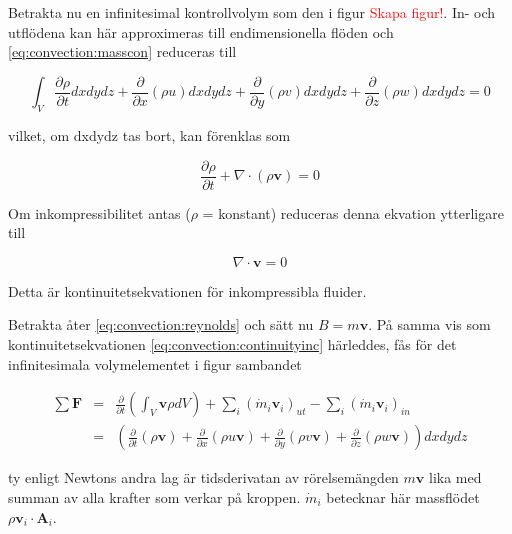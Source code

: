 Betrakta nu en infinitesimal kontrollvolym som den i figur \textcolor{red}{Skapa figur!}. In- och utflödena kan här approximeras till endimensionella flöden och \eqref{eq:convection:masscon} reduceras till

\begin{equation}
\label{eq:convection:massconinf}
\int_V \frac{\partial \rho}{\partial t} dxdydz + \frac{\partial}{\partial x}\left( \rho u \right)dxdydz + \frac{\partial}{\partial y}\left( \rho v \right)dxdydz + \frac{\partial}{\partial z}\left( \rho w \right)dxdydz = 0
\end{equation}

vilket, om dxdydz tas bort, kan förenklas som

\begin{equation}
\label{eq:convection:continuity}
\frac{\partial \rho}{\partial t} + \nabla \cdot \left( \rho \mathbf{v} \right) = 0
\end{equation}

Om inkompressibilitet antas ($\rho$ = konstant) reduceras denna ekvation ytterligare till

\begin{equation}
\label{eq:convection:continuityinc}
\nabla \cdot \mathbf{v} = 0
\end{equation}

Detta är kontinuitetsekvationen för inkompressibla fluider.

Betrakta åter \eqref{eq:convection:reynolds} och sätt nu $B = m\mathbf{v}$. På samma vis som kontinuitetsekvationen \eqref{eq:convection:continuityinc} härleddes, fås för det infinitesimala volymelementet i figur sambandet

\begin{eqnarray}
\label{eq:convection:linear}
\sum \mathbf{F} & = & \frac{\partial}{\partial t} \left( \int_V \mathbf{v} \rho dV \right) + \sum_i \left( \dot{m}_i \mathbf{v}_i \right)_{ut} - \sum_i \left( \dot{m}_i \mathbf{v}_i \right)_{in}\nonumber\\
& = &\left(\frac{\partial}{\partial t} \left( \rho\mathbf{v} \right) + \frac{\partial}{\partial x}\left( \rho u \mathbf{v}\right) + \frac{\partial}{\partial y}\left( \rho v \mathbf{v}\right) + \frac{\partial}{\partial z}\left( \rho w \mathbf{v}\right)\right)dxdydz
\end{eqnarray}

ty enligt Newtons andra lag är tidsderivatan av rörelsemängden $m\mathbf{v}$ lika med summan av alla krafter som verkar på kroppen. $\dot{m}_i$ betecknar här massflödet $\rho\mathbf{v}_i\cdot\mathbf{A}_i$.

